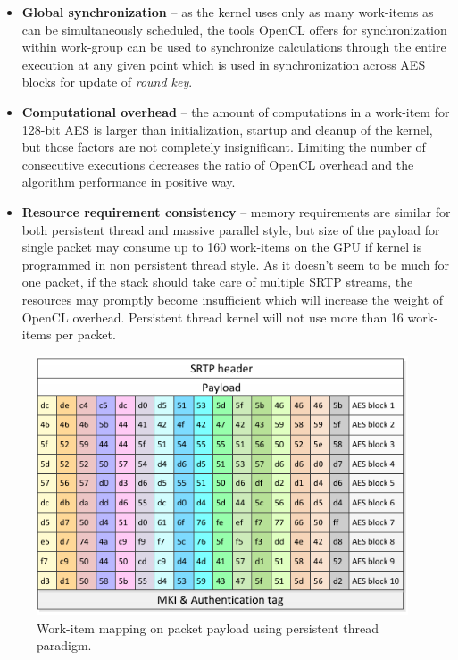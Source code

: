\begin{itemize}
\item \textbf{Global synchronization} -- as the kernel uses only as many 
work-items as can be simultaneously scheduled, the tools OpenCL offers
for synchronization within work-group can be used to synchronize calculations
through the entire execution at any given point which is used in 
synchronization across AES blocks for update of \textit{round key}.
\item \textbf{Computational overhead} -- the amount of computations in a 
work-item for 128-bit AES is larger than initialization, startup and cleanup
of the kernel, but those factors are not completely insignificant. Limiting
the number of consecutive executions decreases the ratio of OpenCL overhead and
the algorithm performance in positive way.
\item \textbf{Resource requirement consistency} -- memory requirements are
similar for both persistent thread and massive parallel style, but size of the 
payload for single packet may consume up to 160 work-items on the GPU if kernel
is programmed in non persistent thread style. As it doesn't seem to be much for
one packet, if the stack should take care of multiple SRTP streams, the 
resources may promptly become insufficient which will increase the weight of 
OpenCL overhead. Persistent thread kernel will not use more than 16 work-items
per packet.
\end{itemize}

\begin{figure}[H]
\centering
\includegraphics[width=11cm]{fig/packet_wi.pdf}
\caption[Persistent thread work-item mapping]{Work-item mapping on packet 
payload using persistent thread paradigm.}
\label{pt_payload}
\end{figure}


